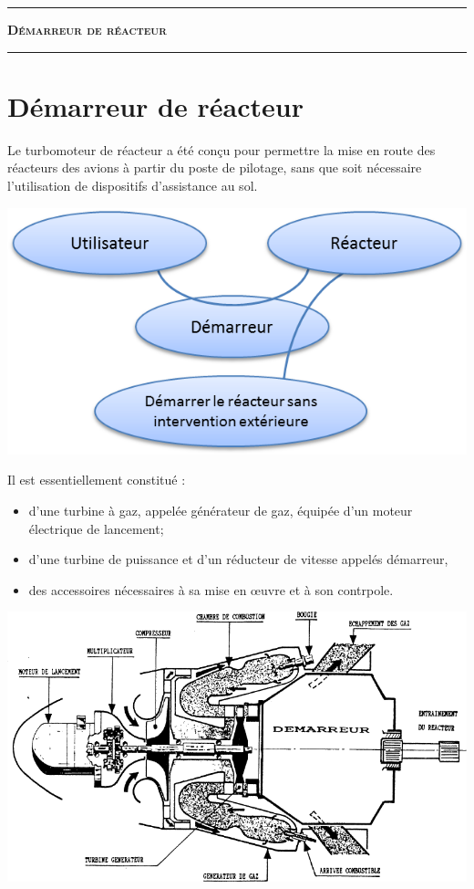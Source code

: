 \documentclass[11pt,oneside]{article}
\begin{document}
\vspace{0.5cm}


\vspace{1cm}


\noindent\rule{\linewidth}{.2pt}
\begin{center}
 \LARGE\textbf{\textsc{Démarreur de réacteur}}
\end{center}
\noindent\rule{\linewidth}{.2pt}

\section*{Démarreur de réacteur}

Le turbomoteur de réacteur a été conçu pour permettre la mise en route des réacteurs des avions à partir du poste de pilotage, sans que soit nécessaire l'utilisation de dispositifs d'assistance au sol. 


\begin{center}
\includegraphics[width=.5\textwidth]{png/bac}
\end{center}

Il est essentiellement constitué :
\begin{itemize}
\item d'une turbine à gaz, appelée générateur de gaz, équipée d'un moteur électrique de lancement;
\item d'une turbine de puissance et d'un réducteur de vitesse appelés démarreur,
\item des accessoires nécessaires à sa mise en \oe{}uvre et à son contrpole. 
\end{itemize}

\begin{center}
\includegraphics[width=.65\textwidth]{png/fig1}
\end{center}
\end{document}
